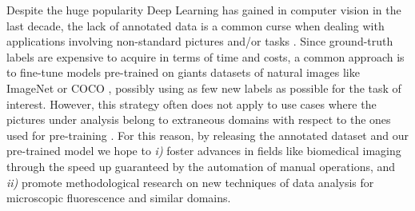 

Despite the huge popularity Deep Learning has gained in computer vision in the last decade, the lack of annotated data is a common curse when dealing with applications involving non-standard pictures and/or tasks \cite{curse_dataset_annotation}. 
Since ground-truth labels are expensive to acquire in terms of time and costs, a common approach is to fine-tune models pre-trained on giants datasets of natural images like ImageNet \cite{ImageNet} or COCO \cite{COCO}, possibly using as few new labels as possible for the task of interest. 
However, this strategy often does not apply to use cases where the pictures under analysis belong to extraneous domains with respect to the ones used for pre-training \cite{TL_medical_imaging}.
For this reason, by releasing the annotated dataset and our pre-trained model we hope to \textit{i)} foster advances in fields like biomedical imaging through the speed up guaranteed by the automation of manual operations, and \textit{ii)} promote methodological research on new techniques of data analysis for microscopic fluorescence and similar domains.